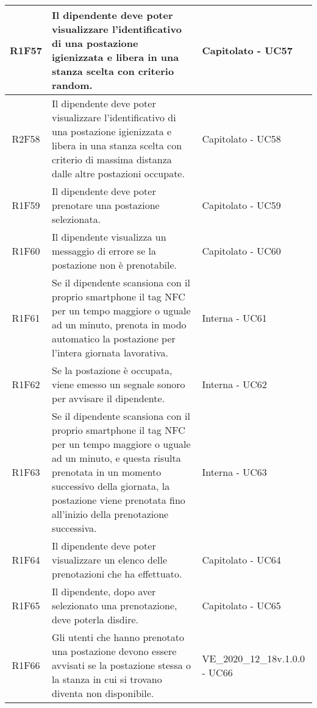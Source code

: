 \begin{center}
\begin{longtable}{|c|p{10cm}|p{4cm}|}
		\hline
		R1F57&Il dipendente deve poter visualizzare l'identificativo di una postazione igienizzata e libera in una stanza scelta con criterio random.	&Capitolato - UC57	\\
		\hline
		R2F58&Il dipendente deve poter visualizzare l'identificativo di una postazione igienizzata e libera in una stanza scelta con criterio di massima distanza dalle altre postazioni occupate.	&Capitolato - UC58	\\
		\hline
		R1F59&Il dipendente deve poter prenotare una postazione selezionata.	&Capitolato - UC59	\\
		\hline
		R1F60&Il dipendente visualizza un messaggio di errore se la postazione non è prenotabile.	&Capitolato - UC60	\\
		\hline
		R1F61&Se il dipendente scansiona con il proprio smartphone il tag NFC per un tempo maggiore o uguale ad un minuto, prenota in modo automatico la postazione per l’intera giornata lavorativa. &Interna - UC61	\\
		\hline
		R1F62&Se la postazione è occupata, viene emesso un segnale sonoro per avvisare il dipendente.	& Interna - UC62	\\
		\hline
		R1F63&Se il dipendente scansiona con il proprio smartphone il tag NFC per un tempo maggiore o uguale ad un minuto, e questa risulta prenotata in un momento successivo della giornata, la postazione viene prenotata fino all'inizio della prenotazione successiva.	&Interna - UC63	\\
		\hline	
		R1F64&Il dipendente deve poter visualizzare un elenco delle prenotazioni che ha effettuato. & Capitolato - UC64	\\
		\hline
		R1F65&Il dipendente, dopo aver selezionato una prenotazione, deve poterla disdire.	&Capitolato - UC65 	\\
		\hline
		R1F66&Gli utenti che hanno prenotato una postazione devono essere avvisati se la postazione stessa o la stanza in cui si trovano diventa non disponibile.	& VE\_2020\_12\_18v.1.0.0 - UC66	\\
		\hline
		

\end{longtable}
\end{center}
